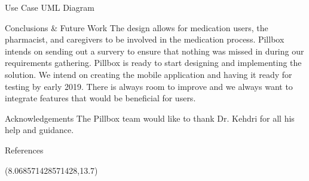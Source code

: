 \documentclass[22pt]{beamer}
\begin{document}
\begin{frame}[fragile]
\begin{textblock}{7.25}
\begin{block}{Use Case UML Diagram}
\end{block}




\begin{block}{Conclusions \& Future Work}
The design allows for medication users, the pharmacist, and caregivers to be involved in the medication process. Pillbox intends on sending out a survery to ensure that nothing was missed in during our requirements gathering. Pillbox is ready to start designing and implementing the solution. We intend on creating the mobile application and having it ready for testing by early 2019. There is always room to improve and we always want to integrate features that would be beneficial for users.

\end{block}

\begin{block}{Acknowledgements}
The Pillbox team would like to thank Dr. Kehdri for all his help and guidance.
\end{block}

\begin{block}{References}

{\scriptsize
}
\end{block}

\end{textblock}


\begin{textblock}{2}(8.068571428571428,13.7)

\end{textblock}

\end{frame}
\end{document}
